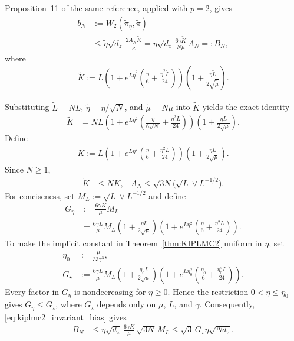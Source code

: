 Proposition~11 of the same reference, applied with $p=2$, gives
\begin{align}
b_N
&:=W_2(\widetilde\pi_{\widetilde\eta},\widetilde\pi)\nonumber\\
&\leq\widetilde\eta\sqrt{d_z}\,
\frac{2A_N\widetilde K}{\widetilde\kappa}
=\eta\sqrt{d_z}\,\frac{6\gamma\widetilde K}{N\mu}\,A_N
=:B_N,
\label{eq:kiplmc2_invariant_bias}
\end{align}
where
\begin{align*}
\widetilde K
:=\widetilde L\left(1+e^{\widetilde L\widetilde\eta^2}
\left(\frac{\widetilde\eta}{6}
+\frac{\widetilde\eta^2\widetilde L}{24}\right)\right)
\left(1+\frac{\widetilde\eta\widetilde L}{2\sqrt{\widetilde\mu}}\right).
\end{align*}

Substituting $\widetilde L=NL$, $\widetilde\eta=\eta/\sqrt N$, and $\widetilde\mu=N\mu$ into $\widetilde K$ yields the exact identity
\begin{align*}
\widetilde K
&=NL\left(1+e^{L\eta^2}
\left(\frac{\eta}{6\sqrt N}+\frac{\eta^2L}{24}\right)\right)\left(1+\frac{\eta L}{2\sqrt\mu}\right).
\end{align*}
Define
\begin{align*}
K:=L\left(1+e^{L\eta^2}
\left(\frac{\eta}{6}+\frac{\eta^2L}{24}\right)\right)
\left(1+\frac{\eta L}{2\sqrt\mu}\right).
\end{align*}
Since $N\geq1$,
\begin{align*}
\widetilde K&\leq NK,
&A_N\leq\sqrt{3N}\bigl(\sqrt L\lor L^{-1/2}\bigr).
\end{align*}
For conciseness, set $M_L:=\sqrt L\lor L^{-1/2}$ and define
\begin{align*}
G_\eta
&:=\frac{6\gamma K}{\mu}M_L\\
&=\frac{6\gamma L}{\mu}M_L \left(1+\frac{\eta L}{2\sqrt\mu}\right)\left(1+e^{L\eta^2}
\left(\frac{\eta}{6}+\frac{\eta^2L}{24}\right)\right).
\end{align*}
To make the implicit constant in Theorem~\ref{thm:KIPLMC2} uniform in $\eta$, set
\begin{align*}
\eta_0&:=\frac{\mu}{33\gamma^3},\\
G_\star
&:=\frac{6\gamma L}{\mu}M_L\left(1+\frac{\eta_0L}{2\sqrt\mu}\right)\left(1+e^{L\eta_0^2}
\left(\frac{\eta_0}{6}+\frac{\eta_0^2L}{24}\right)\right).
\end{align*}
Every factor in $G_\eta$ is nondecreasing for $\eta\geq0$.  Hence the restriction $0<\eta\leq\eta_0$ gives $G_\eta\leq G_\star$, where $G_\star$ depends only on $\mu$, $L$, and $\gamma$.  Consequently, \eqref{eq:kiplmc2_invariant_bias} gives
\begin{align}
B_N
&\leq\eta\sqrt{d_z}\,\frac{6\gamma K}{\mu}\,
\sqrt{3N}\,M_L
\leq\sqrt3\,G_\star\eta\sqrt{Nd_z}.
\label{eq:kiplmc2_coarse_bias}
\end{align}


